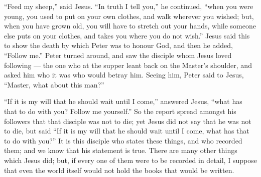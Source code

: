 ``Feed my sheep,'' said Jesus.  ``In truth I tell you,'' he
continued, ``when you were young, you used to put on your own clothes,
and walk wherever you wished; but, when you have grown old, you will
have to stretch out your hands, while someone else puts on your clothes,
and takes you where you do not wish.''  Jesus said this to
show the death by which Peter was to honour God, and then he added,
``Follow me.''  Peter turned around, and saw the disciple
whom Jesus loved following --- the one who at the supper leant back on
the Master's shoulder, and asked him who it was who would betray him.
 Seeing him, Peter said to Jesus, ``Master, what about this
man?''

 ``If it is my will that he should wait until I come,''
answered Jesus, ``what has that to do with you? Follow me yourself.''
 So the report spread amongst his followers that that
disciple was not to die; yet Jesus did not say that he was not to die,
but said ``If it is my will that he should wait until I come, what has
that to do with you?''  It is this disciple who states
these things, and who recorded them; and we know that his statement is
true.  There are many other things which Jesus did; but, if
every one of them were to be recorded in detail, I suppose that even the
world itself would not hold the books that would be written.
